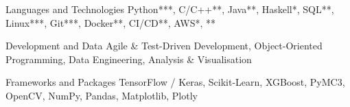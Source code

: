 \vspace{-0.1cm}

\begin{cvskills}

  \cvskill
    {Languages and Technologies}
    {Python***, C/C++**, Java**, Haskell*, SQL**, Linux***, Git***, Docker**, CI/CD**, AWS*, {}**}
    
  \cvskill
    {Development and Data}
    {Agile \& Test-Driven Development, Object-Oriented Programming, Data Engineering, Analysis \& Visualisation}
    
  \cvskill
    {Frameworks and Packages}
    {TensorFlow / Keras, Scikit-Learn, XGBoost, PyMC3, OpenCV, NumPy, Pandas, Matplotlib, Plotly}

\end{cvskills}
